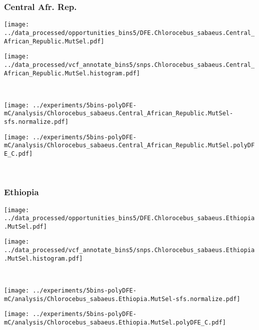 \subsubsection{Central Afr. Rep.}

\begin{minipage}{0.49\linewidth}
    \texttt{[image: ../data\_processed/opportunities\_bins5/DFE.Chlorocebus\_sabaeus.Central\_African\_Republic.MutSel.pdf]}
\end{minipage}
\begin{minipage}{0.49\linewidth}
    \texttt{[image: ../data\_processed/vcf\_annotate\_bins5/snps.Chlorocebus\_sabaeus.Central\_African\_Republic.MutSel.histogram.pdf]}
\end{minipage}
\\
\begin{minipage}{0.49\linewidth}
    \texttt{[image: ../experiments/5bins-polyDFE-mC/analysis/Chlorocebus\_sabaeus.Central\_African\_Republic.MutSel-sfs.normalize.pdf]}
\end{minipage}
\begin{minipage}{0.49\linewidth}
    \texttt{[image: ../experiments/5bins-polyDFE-mC/analysis/Chlorocebus\_sabaeus.Central\_African\_Republic.MutSel.polyDFE\_C.pdf]}
\end{minipage}
\\

\subsubsection{Ethiopia}

\begin{minipage}{0.49\linewidth}
    \texttt{[image: ../data\_processed/opportunities\_bins5/DFE.Chlorocebus\_sabaeus.Ethiopia.MutSel.pdf]}
\end{minipage}
\begin{minipage}{0.49\linewidth}
    \texttt{[image: ../data\_processed/vcf\_annotate\_bins5/snps.Chlorocebus\_sabaeus.Ethiopia.MutSel.histogram.pdf]}
\end{minipage}
\\
\begin{minipage}{0.49\linewidth}
    \texttt{[image: ../experiments/5bins-polyDFE-mC/analysis/Chlorocebus\_sabaeus.Ethiopia.MutSel-sfs.normalize.pdf]}
\end{minipage}
\begin{minipage}{0.49\linewidth}
    \texttt{[image: ../experiments/5bins-polyDFE-mC/analysis/Chlorocebus\_sabaeus.Ethiopia.MutSel.polyDFE\_C.pdf]}
\end{minipage}
\\

